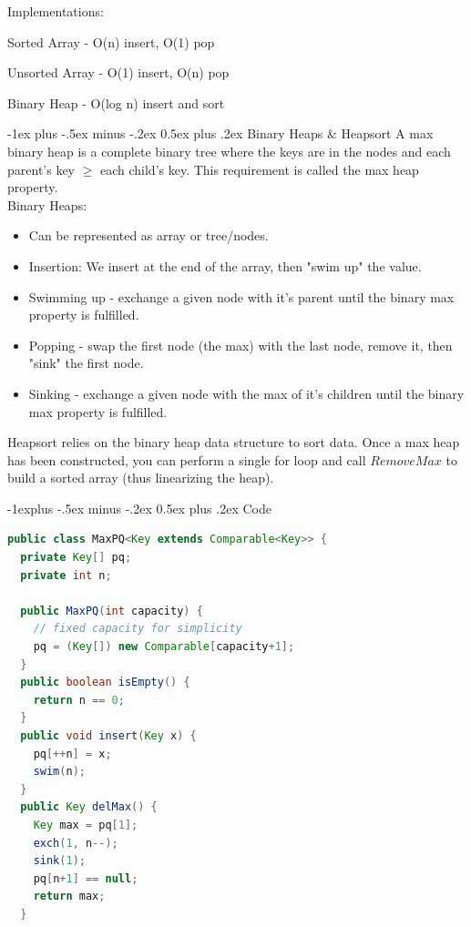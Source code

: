 \documentclass[letterpaper, 8pt]{extarticle}
\makeatletter
\renewcommand{\section}{\@startsection{section}{1}{0mm}%
                                {-1ex plus -.5ex minus -.2ex}%
                                {0.5ex plus .2ex}%
                                {\normalfont\normalsize\bfseries}}
\renewcommand{\subsection}{\@startsection{subsection}{2}{0mm}%
                                {-1explus -.5ex minus -.2ex}%
                                {0.5ex plus .2ex}%
                                {\normalfont\small\bfseries}}
\makeatother
\begin{document}
\begin{multicols*}{5}
  Implementations:
  \begin{list}{}{}
    \item Sorted Array - O(n) insert, O(1) pop
    \item Unsorted Array - O(1) insert, O(n) pop
    \item Binary Heap - O(log n) insert and sort
  \end{list}

  \section{Binary Heaps \& Heapsort}
  A max binary heap is a complete binary tree where
  the keys are in the nodes and each parent's key $\geq$ each child's key.
  This requirement is called the max heap property.
  \\
  Binary Heaps:
  \begin{itemize}
    \item Can be represented as array or tree/nodes.
    \item Insertion: We insert at the end of the array, then "swim up" the value.
    \item Swimming up - exchange a given node with it's parent until the binary max property is fulfilled.
    \item Popping - swap the first node (the max) with the last node, remove it, then "sink" the first node.
    \item Sinking - exchange a given node with the max of it's children until the binary max property is fulfilled.
  \end{itemize}

  Heapsort relies on the binary heap data structure to sort data.
  Once a max heap has been constructed, you can perform a single for loop
  and call $RemoveMax$ to build a sorted array (thus linearizing the heap).

  \subsection{Code}
  \begin{lstlisting}[language=Java, breaklines=true, postbreak=\mbox{\textcolor{red}{$\hookrightarrow$}\space}]
public class MaxPQ<Key extends Comparable<Key>> {
  private Key[] pq;
  private int n;

  public MaxPQ(int capacity) {
    // fixed capacity for simplicity
    pq = (Key[]) new Comparable[capacity+1];
  }
  public boolean isEmpty() {
    return n == 0;
  }
  public void insert(Key x) {
    pq[++n] = x;
    swim(n);
  }
  public Key delMax() {
    Key max = pq[1];
    exch(1, n--);
    sink(1);
    pq[n+1] == null;
    return max;
  }


\end{lstlisting}
\end{multicols*}
\end{document}
